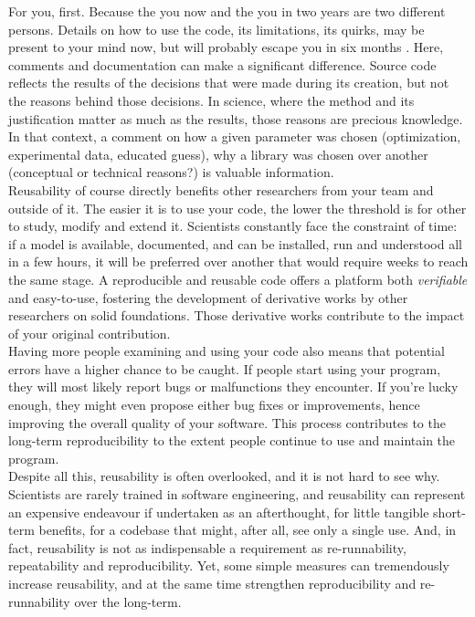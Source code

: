 \documentclass[a4paper,11pt]{article}
\begin{document}
For you, first. Because the you now and the you in two years are two different persons. Details on how to use the code, its limitations, its quirks, may be present to your mind now, but will probably escape you in six months \parencite{Donoho:2009}. Here, comments and documentation can make a significant difference. Source code reflects the results of the decisions that were made during its creation, but not the reasons behind those decisions. In science, where the method and its justification matter as much as the results, those reasons are precious knowledge. In that context, a comment on how a given parameter was chosen (optimization, experimental data, educated guess), why a library was chosen over another (conceptual or technical reasons?) is valuable information.\\


Reusability of course directly benefits other researchers from your team and outside of it. The easier it is to use your code, the lower the threshold is for other to study, modify and extend it. Scientists constantly face the constraint of time: if a model is available, documented, and can be installed, run and understood all in a few hours, it will be preferred over another that would require weeks to reach the same stage. A reproducible and reusable code offers a platform both \emph{verifiable} and easy-to-use, fostering the development of derivative works by other researchers on solid foundations. Those derivative works contribute to the impact of your original contribution.\\

Having more people examining and using your code also means that potential errors have a higher chance to be caught. If people start using your program, they will most likely report bugs or malfunctions they encounter. If you're lucky enough, they might even propose either bug fixes or improvements, hence improving the overall quality of your software. This process contributes to the long-term reproducibility to the extent people continue to use and maintain the program.\\

Despite all this, reusability is often overlooked, and it is not hard to see why. Scientists are rarely trained in software engineering, and reusability can represent an expensive endeavour if undertaken as an afterthought, for little tangible short-term benefits, for a codebase that might, after all, see only a single use. And, in fact, reusability is not as indispensable a requirement as re-runnability, repeatability and reproducibility. Yet, some simple measures can tremendously increase reusability, and at the same time strengthen reproducibility and re-runnability over the long-term.\\
\end{document}
